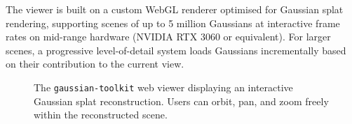 The viewer is built on a custom WebGL renderer optimised for Gaussian splat rendering, supporting scenes of up to 5 million Gaussians at interactive frame rates on mid-range hardware (NVIDIA RTX 3060 or equivalent). For larger scenes, a progressive level-of-detail system loads Gaussians incrementally based on their contribution to the current view.

\begin{figure}[htbp]
  \centering
  \caption{The \texttt{gaussian-toolkit} web viewer displaying an interactive Gaussian splat reconstruction. Users can orbit, pan, and zoom freely within the reconstructed scene.}
  \label{fig:viewer-screenshot}
\end{figure}
